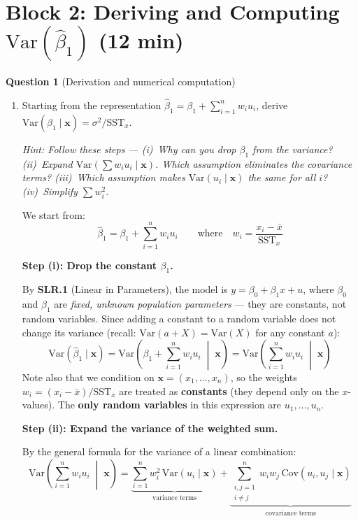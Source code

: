 \documentclass[11pt,a4paper]{article}
\begin{document}
\section{Block 2: Deriving and Computing $\text{Var}(\hat{\beta}_1)$ \textnormal{(12 min)}}

\textbf{Question 1} (Derivation and numerical computation)

\begin{enumerate}[label=(\alph*)]
\item Starting from the representation $\hat{\beta}_1 = \beta_1 + \sum_{i=1}^{n} w_i u_i$, derive $\text{Var}(\hat{\beta}_1 \mid \mathbf{x}) = \sigma^2/\text{SST}_x$.

\textcolor{hintcolor}{\emph{Hint: Follow these steps --- (i)~Why can you drop $\beta_1$ from the variance? (ii)~Expand $\text{Var}(\sum w_i u_i \mid \mathbf{x})$. Which assumption eliminates the covariance terms? (iii)~Which assumption makes $\text{Var}(u_i \mid \mathbf{x})$ the same for all $i$? (iv)~Simplify $\sum w_i^2$.}}

\begin{solution}
We start from:
\[
  \hat{\beta}_1 = \beta_1 + \sum_{i=1}^{n} w_i u_i
  \qquad\text{where}\quad
  w_i = \frac{x_i - \bar{x}}{\text{SST}_x}
\]

\textbf{Step (i): Drop the constant $\beta_1$.}

By \textbf{SLR.1} (Linear in Parameters), the model is $y = \beta_0 + \beta_1 x + u$, where $\beta_0$ and $\beta_1$ are \emph{fixed, unknown population parameters} --- they are constants, not random variables. Since adding a constant to a random variable does not change its variance (recall: $\text{Var}(a + X) = \text{Var}(X)$ for any constant $a$):
\[
  \text{Var}(\hat{\beta}_1 \mid \mathbf{x})
  = \text{Var}\!\left(\beta_1 + \sum_{i=1}^n w_i u_i \;\middle|\; \mathbf{x}\right)
  = \text{Var}\!\left(\sum_{i=1}^n w_i u_i \;\middle|\; \mathbf{x}\right)
\]
Note also that we condition on $\mathbf{x} = (x_1, \ldots, x_n)$, so the weights $w_i = (x_i - \bar{x})/\text{SST}_x$ are treated as \textbf{constants} (they depend only on the $x$-values). The \textbf{only random variables} in this expression are $u_1, \ldots, u_n$.

\bigskip

\textbf{Step (ii): Expand the variance of the weighted sum.}

By the general formula for the variance of a linear combination:
\[
  \text{Var}\!\left(\sum_{i=1}^n w_i u_i \;\middle|\; \mathbf{x}\right)
  = \underbrace{\sum_{i=1}^n w_i^2\,\text{Var}(u_i \mid \mathbf{x})}_{\text{variance terms}}
  + \underbrace{\sum_{\substack{i,j=1 \\ i \ne j}}^{n} w_i w_j\,\text{Cov}(u_i, u_j \mid \mathbf{x})}_{\text{covariance terms}}
\]


\end{solution}
\end{enumerate}
\end{document}
